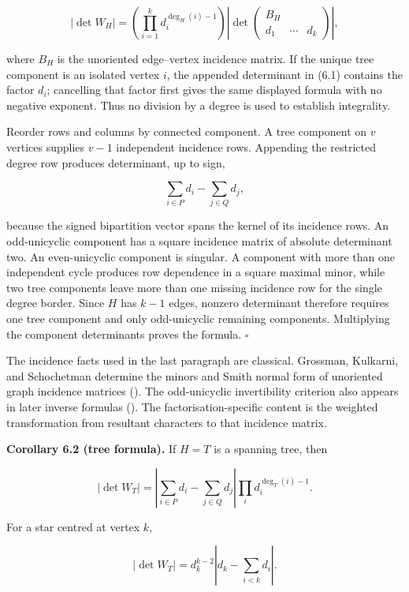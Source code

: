 \documentclass[
  11pt,
  a4paper,
]{article}
\begin{document}
\[
 |\det W_H|
 =\left(\prod_{i=1}^kd_i^{\deg_H(i)-1}\right)
 \left|
 \det\begin{pmatrix}
 B_H\\ d_1&\cdots&d_k
 \end{pmatrix}
 \right|,
\]

where \(B_H\) is the unoriented edge--vertex incidence matrix. If the
unique tree component is an isolated vertex \(i\), the appended
determinant in (6.1) contains the factor \(d_i\); cancelling that factor
first gives the same displayed formula with no negative exponent. Thus
no division by a degree is used to establish integrality.

Reorder rows and columns by connected component. A tree component on
\(v\) vertices supplies \(v-1\) independent incidence rows. Appending
the restricted degree row produces determinant, up to sign,

\[
 \sum_{i\in P}d_i-\sum_{j\in Q}d_j,
\]

because the signed bipartition vector spans the kernel of its incidence
rows. An odd-unicyclic component has a square incidence matrix of
absolute determinant two. An even-unicyclic component is singular. A
component with more than one independent cycle produces row dependence
in a square maximal minor, while two tree components leave more than one
missing incidence row for the single degree border. Since \(H\) has
\(k-1\) edges, nonzero determinant therefore requires one tree component
and only odd-unicyclic remaining components. Multiplying the component
determinants proves the formula. \(\square\)

The incidence facts used in the last paragraph are classical. Grossman,
Kulkarni, and Schochetman determine the minors and Smith normal form of
unoriented graph incidence matrices
().
The odd-unicyclic invertibility criterion also appears in later inverse
formulas ().
The factorisation-specific content is the weighted transformation from
resultant characters to that incidence matrix.

\textbf{Corollary 6.2 (tree formula).} If \(H=T\) is a spanning tree,
then

\[
 \boxed{
 |\det W_T|
 =\left|\sum_{i\in P}d_i-\sum_{j\in Q}d_j\right|
  \prod_i d_i^{\deg_T(i)-1}.
 }
\]

For a star centred at vertex \(k\),

\[
 |\det W_T|
 =d_k^{k-2}\left|d_k-\sum_{i<k}d_i\right|.
\]
\end{document}
